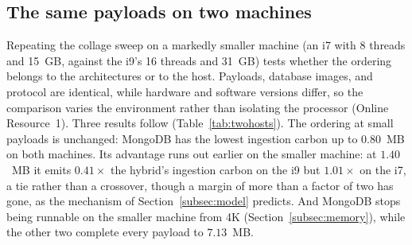 \documentclass[pdflatex,sn-basic]{sn-jnl}%
\begin{document}
\subsection{The same payloads on two machines}\label{subsec:twohosts}
Repeating the collage sweep on a markedly smaller machine (an i7 with 8 threads and 15~GB, against the i9's 16 threads and 31~GB) tests whether the ordering belongs to the architectures or to the host. Payloads, database images, and protocol are identical, while hardware and software versions differ, so the comparison varies the environment rather than isolating the processor (Online Resource~1). Three results follow (Table~\ref{tab:twohosts}). The ordering at small payloads is unchanged: MongoDB has the lowest ingestion carbon up to $0.80$~MB on both machines. Its advantage runs out earlier on the smaller machine: at $1.40$~MB it emits $0.41\times$ the hybrid's ingestion carbon on the i9 but $1.01\times$ on the i7, a tie rather than a crossover, though a margin of more than a factor of two has gone, as the mechanism of Section~\ref{subsec:model} predicts. And MongoDB stops being runnable on the smaller machine from 4K (Section~\ref{subsec:memory}), while the other two complete every payload to $7.13$~MB.
\end{document}
